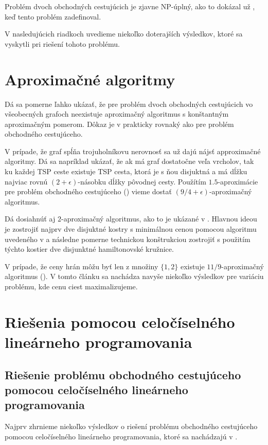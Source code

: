 Problém dvoch obchodných cestujúcich je zjavne NP-úplný, ako to dokázal
už \cite{krarup}, keď tento problém zadefinoval.

V nasledujúcich riadkoch uvedieme niekoľko doterajších výsledkov, ktoré sa vyskytli
pri riešení tohoto problému.

\section{Aproximačné algoritmy}

Dá sa pomerne ľahko ukázať, že pre problém dvoch obchodných cestujúcich vo všeobecných grafoch
neexistuje aproximačný algoritmus s konštantným aproximačným pomerom. Dôkaz je v prakticky
rovnaký ako pre problém obchodného cestujúceho.

V prípade, že graf spĺňa trojuholníkovu nerovnosť sa už dajú nájsť approximačné algoritmy.
Dá sa napríklad ukázať, že ak má graf dostatočne veľa vrcholov, tak ku každej TSP ceste
existuje TSP cesta, ktorá je s ňou disjuktná a má dĺžku najviac rovnú $(2+\epsilon)$-násobku
dĺžky pôvodnej cesty.
Použítím $1.5$-aproximácie pre problém obchodného cestujúceho (\cite{christofides}) vieme
dostať $(9/4 + \epsilon)$-aproximačný algoritmus. 

Dá dosiahnúť aj $2$-aproximačný algoritmus, ako to je ukázané v \cite{apx2}. Hlavnou
ideou je zostrojiť najprv dve disjuktné kostry s minimálnou cenou pomocou algoritmu
uvedeného v \cite{spanning2} a následne pomerne technickou konštrukciou zostrojiť
s použitím týchto kostier dve disjunktné hamiltonovské kružnice.

V prípade, že ceny hrán môžu byť len z množiny $\{1,2\}$ existuje $11/9$-aproximačný
algoritmus (\cite{gimadi}). V tomto článku sa nachádza navyše niekoľko výsledkov pre 
variáciu problému, kde cenu ciest maximalizujeme.

\section{Riešenia pomocou celočíselného lineárneho programovania}

\subsection{Riešenie problému obchodného cestujúceho pomocou celočíselného
lineárneho programovania}

Najprv zhrnieme niekoľko výsledkov o riešení problému obchodného cestujúceho pomocou
celočíselného lineárneho programovania, ktoré sa nachádzajú v \cite{tspsurvey}.

